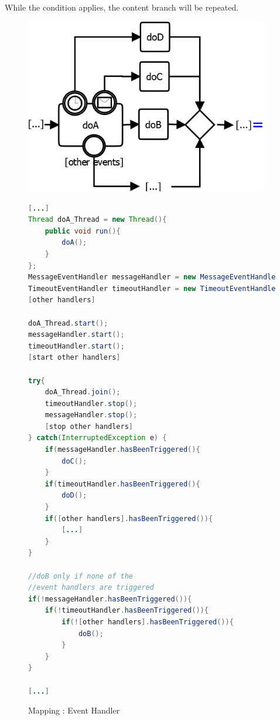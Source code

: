While the condition applies, the content branch will be repeated. 

\begin{figure}[h]
\begin{minipage}[c]{0.45\textwidth}
	\includegraphics[width=0.95\textwidth]{images/mapping/event_handler.png}
\end{minipage}
\begin{minipage}[c]{0.55\textwidth}
\begin{lstlisting}[language=Java]
[...]
Thread doA_Thread = new Thread(){
	public void run(){
		doA();
	}
};
MessageEventHandler messageHandler = new MessageEventHandler(doA_Thread);
TimeoutEventHandler timeoutHandler = new TimeoutEventHandler(20000, doA_Thread);
[other handlers]

doA_Thread.start();
messageHandler.start();
timeoutHandler.start();
[start other handlers]

try{
	doA_Thread.join();
	timeoutHandler.stop();
	messageHandler.stop();
	[stop other handlers]
} catch(InterruptedException e) {
	if(messageHandler.hasBeenTriggered(){
		doC();
	}
	if(timeoutHandler.hasBeenTriggered(){
		doD();
	}
	if([other handlers].hasBeenTriggered()){
		[...]
	}
}

//doB only if none of the 
//event handlers are triggered
if(!messageHandler.hasBeenTriggered()){
	if(!timeoutHandler.hasBeenTriggered()){
		if(![other handlers].hasBeenTriggered()){	
			doB(); 
		}
	}
}

[...]
\end{lstlisting}
\end{minipage}
\caption{Mapping : Event Handler}%
\label{fig:mapping_eventhandler}%
\end{figure}

